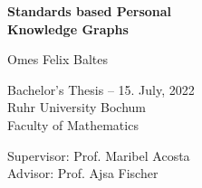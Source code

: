 \begin{titlepage}
    \begin{center}
        \vspace*{1cm}
        \Huge
        \textbf{Standards based Personal\\ Knowledge Graphs}\\
        
        \vspace*{1cm}
        
        \Large
        Omes Felix Baltes
      
        \vfill
        
        \large
        Bachelor's Thesis -- 15. July, 2022\\
        
        Ruhr University Bochum\\
        Faculty of Mathematics\\
        
        \vspace{1cm}
        
        
        Supervisor: Prof. Maribel Acosta\\
        Advisor: Prof. Ajsa Fischer\\
 
    \end{center}
\end{titlepage}